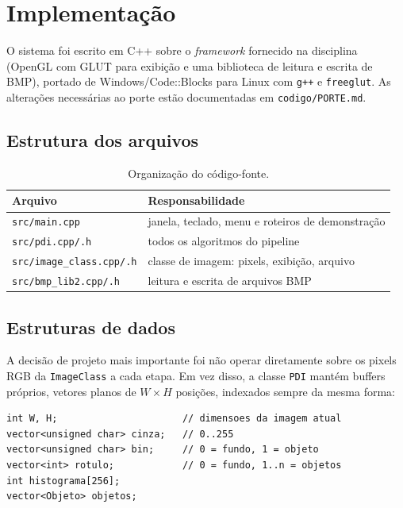 \documentclass[12pt,a4paper]{article}
\begin{document}
\section{Implementação}

O sistema foi escrito em C++ sobre o \emph{framework} fornecido na disciplina
(OpenGL com GLUT para exibição e uma biblioteca de leitura e escrita de BMP),
portado de Windows/Code::Blocks para Linux com \texttt{g++} e
\texttt{freeglut}. As alterações necessárias ao porte estão documentadas em
\texttt{codigo/PORTE.md}.

\subsection{Estrutura dos arquivos}

\begin{table}[H]
\centering
\begin{tabular}{ll}
\toprule
\textbf{Arquivo} & \textbf{Responsabilidade} \\
\midrule
\texttt{src/main.cpp}      & janela, teclado, menu e roteiros de demonstração \\
\texttt{src/pdi.cpp/.h}    & todos os algoritmos do pipeline \\
\texttt{src/image\_class.cpp/.h} & classe de imagem: pixels, exibição, arquivo \\
\texttt{src/bmp\_lib2.cpp/.h}    & leitura e escrita de arquivos BMP \\
\bottomrule
\end{tabular}
\caption{Organização do código-fonte.}
\end{table}

\subsection{Estruturas de dados}

A decisão de projeto mais importante foi não operar diretamente sobre os
pixels RGB da \texttt{ImageClass} a cada etapa. Em vez disso, a classe
\texttt{PDI} mantém buffers próprios, vetores planos de $W \times H$
posições, indexados sempre da mesma forma:

\begin{lstlisting}
int W, H;                      // dimensoes da imagem atual
vector<unsigned char> cinza;   // 0..255
vector<unsigned char> bin;     // 0 = fundo, 1 = objeto
vector<int> rotulo;            // 0 = fundo, 1..n = objetos
int histograma[256];
vector<Objeto> objetos;
\end{lstlisting}
\end{document}
